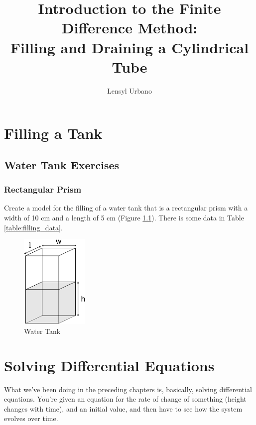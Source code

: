\documentclass[11pt,fleqn]{book}
\title{Introduction to the Finite Difference Method: \\ Filling and Draining a Cylindrical Tube}
\author{Lensyl Urbano}
\begin{document}
         
 
\maketitle

\chapter{Filling a Tank}

    \section{Water Tank Exercises}

	\subsection{Rectangular Prism}
	
		Create a model for the filling of a water tank that is a rectangular prism with a width of 10 cm and a length of 5 cm (Figure \ref{fig:prismTank}). There is some data in Table \ref{table:filling_data}.
		
	\begin{figure}[h]
		\label{fig:prismTank}
		\begin{center}
			
			\includegraphics[height=4.5cm]{prism-lwh.pdf}
			\caption{Water Tank}
		\end{center}
	\end{figure}


	
\chapter{Solving Differential Equations}

	What we've been doing in the preceding chapters is, basically, solving differential equations. You're given an equation for the rate of change of something (height changes with time), and an initial value, and then have to see how the system evolves over time. 
	
\end{document}
